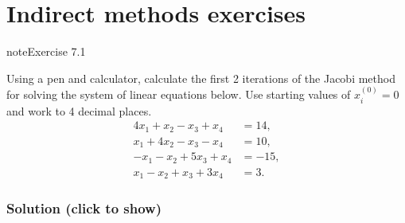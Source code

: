 \documentclass[letterpaper,10pt,english]{jupyterBook}
\begin{document}
\sphinxstepscope


\section{Indirect methods exercises}
\label{\detokenize{7_Indirect_methods/7.6_Indirect_methods_exercises:indirect-methods-exercises}}\label{\detokenize{7_Indirect_methods/7.6_Indirect_methods_exercises::doc}}
\begin{sphinxadmonition}{note}{Exercise 7.1}

\sphinxAtStartPar
Using a pen and calculator, calculate the first 2 iterations of the Jacobi method for solving the system of linear equations below. Use starting values of \(x_i^{(0)} = 0 \) and work to 4 decimal places.
\begin{align*}
    4x_1 +x_2 -x_3 +x_4 &=14,\\
    x_1 +4x_2 -x_3 -x_4 &=10,\\
    -x_1 -x_2 +5x_3 +x_4 &=-15,\\
    x_1 -x_2 +x_3 +3x_4 &=3.
\end{align*}\subsubsection*{Solution (click to show)}


\end{sphinxadmonition}
\end{document}
